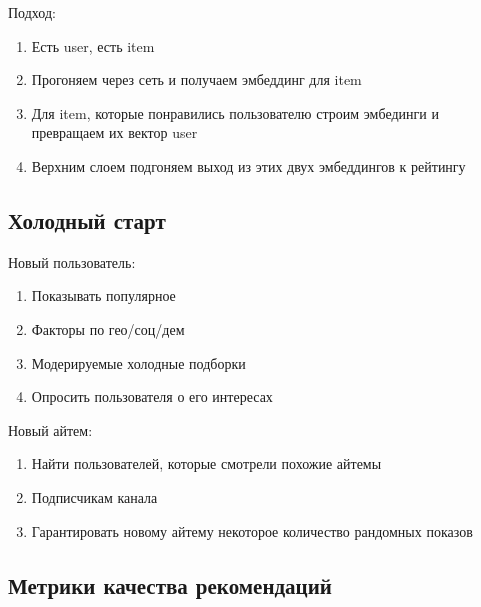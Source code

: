 \documentclass[a4paper, 12pt]{article}
\begin{document}
Подход:

\begin{enumerate}
    \item Есть user, есть item
    \item Прогоняем через сеть и получаем эмбеддинг для item
    \item Для item, которые понравились пользователю строим эмбединги и
    превращаем их вектор user
    \item Верхним слоем подгоняем выход из этих двух эмбеддингов к рейтингу
\end{enumerate}

\subsection{Холодный старт}

Новый пользователь:

\begin{enumerate}
    \item Показывать популярное
    \item Факторы по гео/соц/дем
    \item Модерируемые холодные подборки
    \item Опросить пользователя о его интересах
\end{enumerate}

Новый айтем:

\begin{enumerate}
    \item Найти пользователей, которые смотрели похожие айтемы
    \item Подписчикам канала
    \item Гарантировать новому айтему некоторое количество рандомных показов
\end{enumerate}

\subsection{Метрики качества рекомендаций}
\end{document}
